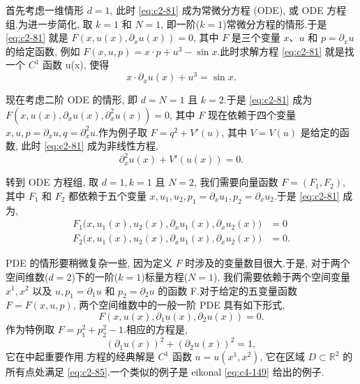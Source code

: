首先考虑一维情形 $d = 1$, 此时 \eqref{eq:c2-81} 成为常微分方程 (ODE), 或 ODE 方程组.为进一步简化, 取 $k = 1$ 和 $N = 1$, 即一阶($k = 1$)常微分方程的情形.于是 \eqref{eq:c2-81} 就是 $F(x, u(x), \partial_{x} u(x)) = 0$, 其中 $F$ 是三个变量 $x$、$u$ 和 $p = \partial_{x} u$ 的给定函数, 例如 $F(x, u, p) = x \cdot p + u^{3} - \sin x$.此时求解方程 \eqref{eq:c2-81} 就是找一个 $C^{1}$ 函数 u(x), 使得
\begin{equation}
x \cdot \partial_{x} u(x) + u^{3} = \sin x. \label{eq:c2-82}
\end{equation}

现在考虑二阶 ODE 的情形, 即 $d = N = 1$ 且 $k = 2$.于是 \eqref{eq:c2-81} 成为 $F(x, u(x), \partial_{x} u(x), \partial_{x}^{2} u(x)) = 0$, 其中 $F$ 现在依赖于四个变量 $x, u, p = \partial_{x} u, q = \partial_{x}^{2} u$.作为例子取 $F = q^{2} + V'(u)$, 其中 $V = V(u)$ 是给定的函数, 此时 \eqref{eq:c2-81} 成为非线性方程,
\begin{equation}
\partial_{x}^{2} u(x) + V'(u(x)) = 0. \label{eq:c2-83}
\end{equation}

转到 ODE 方程组, 取 $d = 1, k = 1$ 且 $N = 2$, 我们需要向量函数 $F = (F_{1}, F_{2})$, 其中 $F_{1}$ 和 $F_{2}$ 都依赖于五个变量 $x, u_{1}, u_{2}, p_{1} = \partial_{x} u_{1}, p_{2} = \partial_{x} u_{2}$.于是 \eqref{eq:c2-81} 成为,
\[
\begin{aligned}
F_{1}\bigl(x, u_{1}(x), u_{2}(x), \partial_{x} u_{1}(x), \partial_{x} u_{2}(x)\bigr) &= 0 \\
F_{2}\bigl(x, u_{1}(x), u_{2}(x), \partial_{x} u_{1}(x), \partial_{x} u_{2}(x)\bigr) &= 0.
\end{aligned}
\]

PDE 的情形要稍微复杂一些, 因为定义 $F$ 时涉及的变量数目很大.于是, 对于两个空间维数($d = 2$)下的一阶($k = 1$)标量方程($N = 1$), 我们需要依赖于两个空间变量 $x^{1}, x^{2}$ 以及 $u, p_{1} = \partial_{1} u$ 和 $p_{2} = \partial_{2} u$ 的函数 F.对于给定的五变量函数 $F = F(x, u, p)$, 两个空间维数中的一般一阶 PDE 具有如下形式,
\begin{equation}
F(x, u(x), \partial_{1} u(x), \partial_{2} u(x)) = 0. \label{eq:c2-84}
\end{equation}
作为特例取 $F = p_{1}^{2} + p_{2}^{2} - 1$.相应的方程是,
\begin{equation}
(\partial_{1} u(x))^{2} + (\partial_{2} u(x))^{2} = 1, \label{eq:c2-85}
\end{equation}
它在中起重要作用.方程的经典解是 $C^{1}$ 函数 $u = u(x^{1}, x^{2})$, 它在区域 $D \subset \mathbb{R}^{2}$ 的所有点处满足 \eqref{eq:c2-85}.一个类似的例子是 eikonal \eqref{eq:c4-149} 给出的例子.

